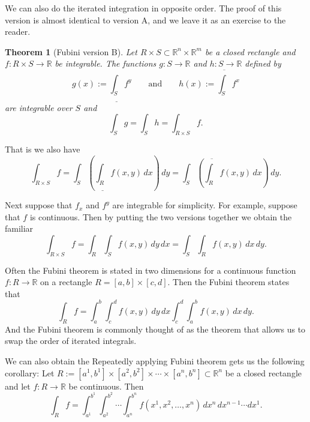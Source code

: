 \documentclass[12pt]{book}
\newcommand{\R}{{\mathbb{R}}}
\theoremstyle{plain}
\newtheorem{thm}{Theorem}[section]
\theoremstyle{remark}
\theoremstyle{definition}
\theoremstyle{exercise}
\theoremstyle{example}
\begin{document}
We can also do the iterated integration in opposite order.
The proof of this version is almost identical to version A, and
we leave it as an exercise to the reader.

\begin{thm}[Fubini version B]\label{mv:fubinivB}
Let $R \times S \subset \R^n \times \R^m$ be a closed rectangle and
$f \colon R \times S \to \R$ be integrable.
The functions $g \colon S \to \R$ and $h \colon S \to \R$ defined by
\begin{equation*}
g(x) := \underline{\int_S} f^y \qquad
\text{and} \qquad
h(x) := \overline{\int_S} f^x 
\end{equation*}
are integrable over $S$ and
\begin{equation*}
\int_S g = \int_S h = \int_{R \times S} f .
\end{equation*}
\end{thm}

That is we also have
\begin{equation*}
\int_{R \times S} f
=
 \int_S \left(
 \underline{\int_R} f(x,y) \, dx
\right) \, dy
=
 \int_S \left(
 \overline{\int_R} f(x,y) \, dx
\right) \, dy .
\end{equation*}

Next suppose that $f_x$ and $f^y$ are integrable for simplicity.
For example, suppose that $f$ is continuous.  Then by
putting the two versions together we obtain the familiar
\begin{equation*}
\int_{R \times S} f
=
 \int_R 
 \int_S f(x,y) \, dy \, dx 
=
 \int_S 
 \int_R f(x,y) \, dx \, dy .
\end{equation*}

Often the Fubini theorem is stated in two dimensions
for a continuous function $f \colon R \to
\R$ on a rectangle $R = [a,b] \times [c,d]$.  Then the Fubini theorem
states that
\begin{equation*}
\int_R f = \int_a^b \int_c^d f(x,y) \,dy\,dx
\int_c^d \int_a^b f(x,y) \,dx\,dy .
\end{equation*}
And the Fubini theorem is commonly thought of as the theorem that allows us
to swap the order of iterated integrals.

We can also obtain the 
Repeatedly applying Fubini theorem gets us the following
corollary:
Let $R := [a^1,b^1] \times [a^2,b^2] \times \cdots \times [a^n,b^n] \subset
\R^n$ be a closed rectangle and let
$f \colon R \to \R$ be continuous.  Then
\begin{equation*}
\int_R f = 
\int_{a^1}^{b^1}
\int_{a^2}^{b^2}
\cdots
\int_{a^n}^{b^n}
f(x^1,x^2,\ldots,x^n)
\,
dx^n
\,
dx^{n-1}
\cdots
dx^1 .
\end{equation*}
\end{document}
